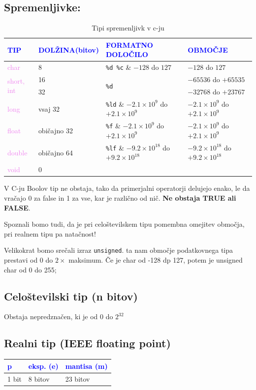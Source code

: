 \documentclass[a4paper, 12pt]{article}
\begin{document}
\subsection{Spremenljivke:}
\begin{table}[!htbp]
	\centering
	\begin{tabular}[b]{|p{3cm}|p{3cm}|p{3cm}|p{4.5cm}|}
		\hline \textcolor{blue}{TIP} & \textcolor{blue}{DOLŽINA(bitov)} & \textcolor{blue}{FORMATNO DOLOČILO} & \textcolor{blue}{OBMOČJE} \\ \hline\hline
		\textcolor{violet}{char} & 8 & \verb|%d %c| & $-128$ do $127$ \\
		\multirow{2}{*}{\textcolor{violet}{short, int}} & 16 & \multirow{2}{*}{\texttt{\%d}} & $-65536$ do $+65535$ \\
		& 32 && $-32768$ do $+23767$ \\
		\textcolor{violet}{long} & vsaj 32 & \verb|%ld| & $-2.1\times10^9$ do $+2.1\times10^9$\\
		\textcolor{violet}{float} & običajno 32 & \verb|%f| & $-2.1\times10^9$ do $+2.1\times10^9$\\
		\textcolor{violet}{double} & običajno 64 & \verb|%lf| & $-9.2\times10^{18}$ do $+9.2\times10^{18}$ \\
		\textcolor{violet}{void} & 0 & & \\ \hline
	\end{tabular}
	\caption{Tipi spremenljivk v c-ju}
\end{table}
%
V C-ju Boolov tip ne obstaja, tako da primerjalni operatorji delujejo enako, le da vračajo 0 za false in 1 za vse, kar je različno od nič. \textbf{Ne obstaja TRUE ali FALSE}.\

Spoznali bomo tudi, da je pri celoštevilskem tipu pomembna omejitev območja, pri realnem tipu pa natačnost!

Velikokrat bomo srečali izraz \lstinline|unsigned|. ta nam območje podatkovnega tipa prestavi od 0 do $2\times$ maksimum. Če je char od -128 dp 127, potem je unsigned char od 0 do 255;

\subsection{Celoštevilski tip (n bitov)}
Obstaja nepredznačen, ki je od 0 do $2^{32}$

\subsection{Realni tip (IEEE floating point)}
\begin{table}[!htbp]
	\centering
	\begin{tabular}{|l|l|l|}
		\hline \textcolor{blue}{p} & \textcolor{blue}{eksp. (e)} & \textcolor{blue}{mantisa (m)} \\ \hline
		1 bit & 8 bitov & 23 bitov \\ \hline
	\end{tabular}
\end{table}
\end{document}
